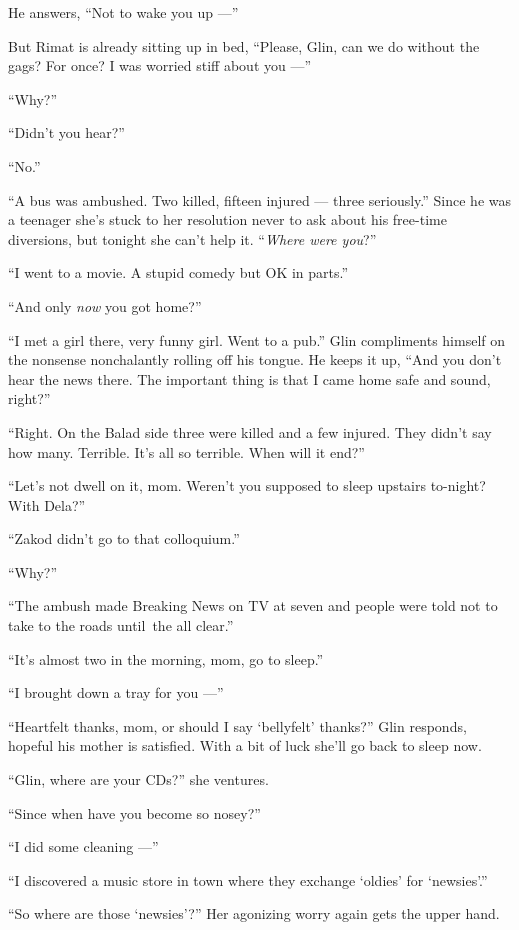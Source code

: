 \documentclass[twoside,11pt]{book}
\begin{document}
He answers, ``Not to wake you up ---''

But Rimat is already sitting up in bed, ``Please, Glin, can we do without the gags? For once? I was worried
stiff about you ---''

``Why?''

``Didn't you hear?''

``No.''

``A bus was ambushed. Two killed, fifteen injured --- three seriously.'' Since he was a teenager
she's stuck to her resolution never{ }to ask about his
free-time diversions, but tonight she can't help it.
``\textit{Where were you}?''

``I went to a movie. A stupid comedy but OK in parts.''

``And only \textit{now} you got home?''

``I met a girl there, very funny girl. Went to a pub.'' Glin compliments himself on the
nonsense nonchalantly rolling off his tongue. He keeps it up, ``And you don't hear the news there. The
important thing is that I came home safe and sound, right?''

``Right. On the Balad side three were killed and a few injured. They didn't say how many. Terrible. It's
all so terrible. When will it end?''

``Let's not dwell on it, mom. Weren't you supposed to sleep upstairs to-night? With Dela?''

``Zakod didn't go to that colloquium.''

``Why?''

``The ambush made Breaking News on TV at seven and people were told not to take to the roads until~the all
clear.''

``It's almost two in the morning, mom, go to sleep.''

``I brought down a tray for you ---''

``Heartfelt thanks, mom, or should I say `bellyfelt' thanks?'' Glin responds, hopeful his
mother is satisfied. With a bit of luck she'll go back to sleep now.

``Glin, where are your CDs?''  she ventures.

``Since when have you become so nosey?''

``I did some cleaning ---''

``I discovered a music store in town where they exchange `oldies' for `newsies'.''

``So where are those `newsies{}'?'' Her agonizing worry again gets the upper hand.
\end{document}
